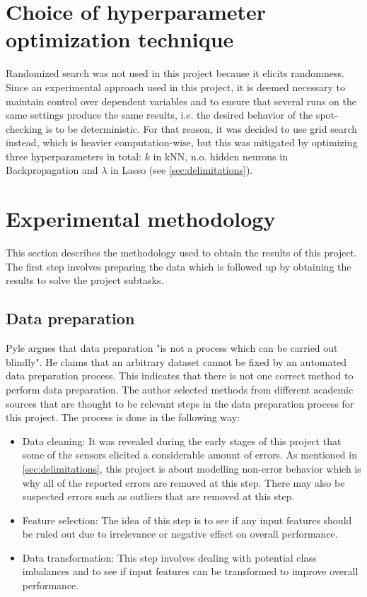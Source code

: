 \section{Choice of hyperparameter optimization technique} \label{sec:hyper_opt_techniques}
	Randomized search was not used in this project because it elicits randomness. Since an experimental approach used in this project, it is deemed necessary to maintain control over dependent variables and to ensure that several runs on the same settings produce the same results, i.e. the desired behavior of the spot-checking is to be deterministic. For that reason, it was decided to use grid search instead, which is heavier computation-wise, but this was mitigated by optimizing three hyperparameters in total: $k$ in kNN, n.o. hidden neurons in Backpropagation and $\lambda$ in Lasso (see \ref{sec:delimitations}). %
	

\section{Experimental methodology}
	This section describes the methodology used to obtain the results of this project. The first step involves preparing the data which is followed up by obtaining the results to solve the project subtasks. 

	\subsection{Data preparation} \label{sec:method_dataprep}
		Pyle \cite{BOOK:15} argues that data preparation "is not a process which can be carried out blindly". He claims that an arbitrary dataset cannot be fixed by an automated data preparation process. This indicates that there is not one correct method to perform data preparation. The author selected methods from different academic sources \cite{BOOK:15, BOOK:16, BOOK:17} that are thought to be relevant steps in the data preparation process for this project. The process is done in the following way:
	\begin{itemize}
		\item{Data cleaning: } It was revealed during the early stages of this project that some of the sensors elicited a considerable amount of errors. As mentioned in \ref{sec:delimitations}, this project is about modelling non-error behavior which is why all of the reported errors are removed at this step. There may also be suspected errors such as outliers that are removed at this step.
		\item{Feature selection: } The idea of this step is to see if any input features should be ruled out due to irrelevance or negative effect on overall performance.
		\item{Data transformation: } This step involves dealing with potential class imbalances and to see if input features can be transformed to improve overall performance.
	\end{itemize}

